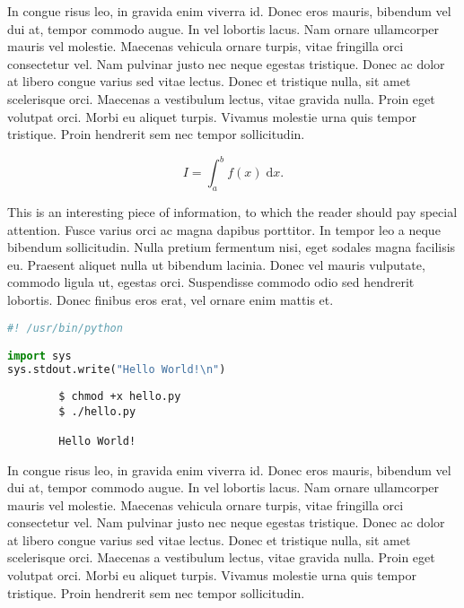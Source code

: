 \documentclass{article}
\begin{document}
\begin{question}
	In congue risus leo, in gravida enim viverra id. Donec eros mauris, bibendum vel dui at, tempor commodo augue. In vel lobortis lacus. Nam ornare ullamcorper mauris vel molestie. Maecenas vehicula ornare turpis, vitae fringilla orci consectetur vel. Nam pulvinar justo nec neque egestas tristique. Donec ac dolor at libero congue varius sed vitae lectus. Donec et tristique nulla, sit amet scelerisque orci. Maecenas a vestibulum lectus, vitae gravida nulla. Proin eget volutpat orci. Morbi eu aliquet turpis. Vivamus molestie urna quis tempor tristique. Proin hendrerit sem nec tempor sollicitudin.
\end{question}

\begin{equation}
	I = \int_{a}^{b} f(x) \; \text{d}x.
\end{equation}

\begin{info} %
	This is an interesting piece of information, to which the reader should pay special attention. Fusce varius orci ac magna dapibus porttitor. In tempor leo a neque bibendum sollicitudin. Nulla pretium fermentum nisi, eget sodales magna facilisis eu. Praesent aliquet nulla ut bibendum lacinia. Donec vel mauris vulputate, commodo ligula ut, egestas orci. Suspendisse commodo odio sed hendrerit lobortis. Donec finibus eros erat, vel ornare enim mattis et.
\end{info}

\begin{file}[hello.py]
\begin{lstlisting}[language=Python]
#! /usr/bin/python

import sys
sys.stdout.write("Hello World!\n")
\end{lstlisting}
\end{file}

\begin{commandline}
	\begin{verbatim}
		$ chmod +x hello.py
		$ ./hello.py

		Hello World!
	\end{verbatim}
\end{commandline}


\begin{warn}[Notice:]
  In congue risus leo, in gravida enim viverra id. Donec eros mauris, bibendum vel dui at, tempor commodo augue. In vel lobortis lacus. Nam ornare ullamcorper mauris vel molestie. Maecenas vehicula ornare turpis, vitae fringilla orci consectetur vel. Nam pulvinar justo nec neque egestas tristique. Donec ac dolor at libero congue varius sed vitae lectus. Donec et tristique nulla, sit amet scelerisque orci. Maecenas a vestibulum lectus, vitae gravida nulla. Proin eget volutpat orci. Morbi eu aliquet turpis. Vivamus molestie urna quis tempor tristique. Proin hendrerit sem nec tempor sollicitudin.
\end{warn}
\end{document}
